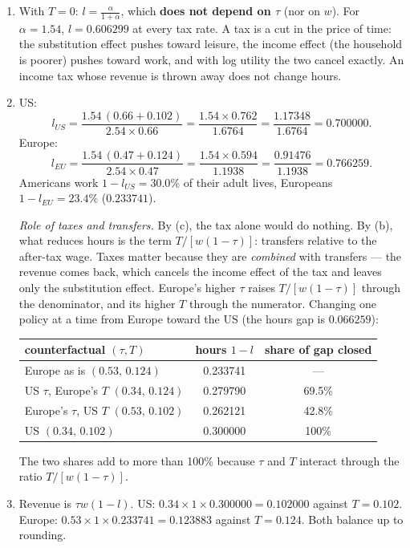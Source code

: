 \documentclass[12pt, letterpaper]{article}
\begin{document}
\begin{tcolorbox}[oddbox,title={Problem 7.5 \quad Prescott's Calculation}]
\begin{enumerate}
\item With $T=0$: $l=\frac{\alpha}{1+\alpha}$, which \textbf{does not depend on $\tau$} (nor
on $w$). For $\alpha=1.54$, $l=0.606299$ at every tax rate. A tax is a cut in the price of
time: the substitution effect pushes toward leisure, the income effect (the household is
poorer) pushes toward work, and with log utility the two cancel exactly. An income tax whose
revenue is thrown away does not change hours.

\item US:
\[
l_{US}=\frac{1.54\,(0.66+0.102)}{2.54\times0.66}=\frac{1.54\times0.762}{1.6764}
=\frac{1.17348}{1.6764}=0.700000 .
\]
Europe:
\[
l_{EU}=\frac{1.54\,(0.47+0.124)}{2.54\times0.47}=\frac{1.54\times0.594}{1.1938}
=\frac{0.91476}{1.1938}=0.766259 .
\]
Americans work $1-l_{US}=\mathbf{30.0\%}$ of their adult lives, Europeans
$1-l_{EU}=\mathbf{23.4\%}$ ($0.233741$).

\emph{Role of taxes and transfers.} By (c), the tax alone would do nothing. By (b), what
reduces hours is the term $T/[w(1-\tau)]$: transfers relative to the after-tax wage.
Taxes matter because they are \emph{combined} with transfers --- the revenue comes back, which
cancels the income effect of the tax and leaves only the substitution effect. Europe's higher
$\tau$ raises $T/[w(1-\tau)]$ through the denominator, and its higher $T$ through the
numerator. Changing one policy at a time from Europe toward the US (the hours gap is $0.066259$):

\begin{center}
\begin{tabular}{@{}lcc@{}}
\toprule
counterfactual $(\tau,T)$ & hours $1-l$ & share of gap closed\\
\midrule
Europe as is $(0.53,\,0.124)$ & 0.233741 & ---\\
US $\tau$, Europe's $T$ $(0.34,\,0.124)$ & 0.279790 & 69.5\%\\
Europe's $\tau$, US $T$ $(0.53,\,0.102)$ & 0.262121 & 42.8\%\\
US $(0.34,\,0.102)$ & 0.300000 & 100\%\\
\bottomrule
\end{tabular}
\end{center}
The two shares add to more than 100\% because $\tau$ and $T$ interact through the ratio
$T/[w(1-\tau)]$.

\item Revenue is $\tau w(1-l)$. US: $0.34\times1\times0.300000=0.102000$ against
$T=0.102$. Europe: $0.53\times1\times0.233741=0.123883$ against $T=0.124$. Both balance up to
rounding. \checkmark


\end{enumerate}
\end{tcolorbox}
\end{document}
